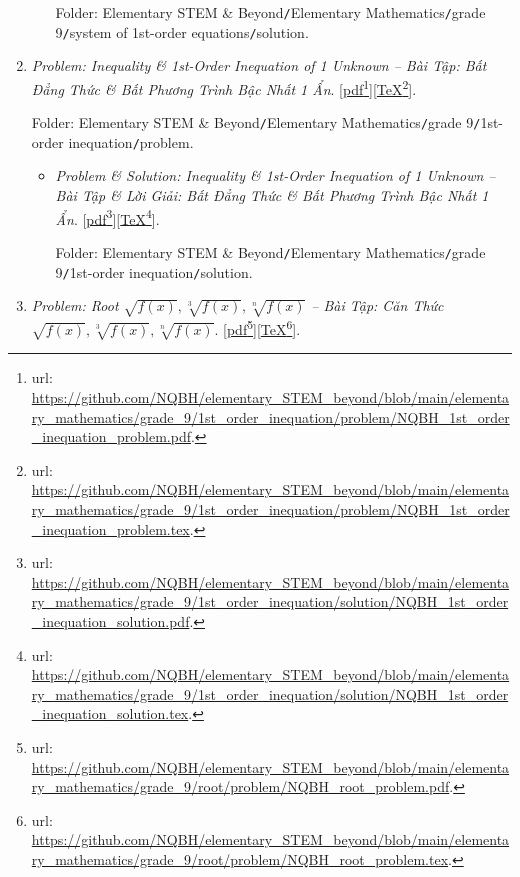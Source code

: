 \documentclass[12pt,oneside]{book}
\begin{document}
\begin{enumerate}
\begin{itemize}
		Folder: {\sf Elementary STEM \& Beyond{\tt/}Elementary Mathematics{\tt/}grade 9{\tt/}system of 1st-order equations{\tt/}solution}.
	\end{itemize}
	\item {\it Problem: Inequality \& 1st-Order Inequation of 1 Unknown -- Bài Tập: Bất Đẳng Thức \& Bất Phương Trình Bậc Nhất 1 Ẩn}. [\href{https://github.com/NQBH/elementary_STEM_beyond/blob/main/elementary_mathematics/grade_9/1st_order_inequation/problem/NQBH_1st_order_inequation_problem.pdf}{pdf}\footnote{{\sc url}: \url{https://github.com/NQBH/elementary_STEM_beyond/blob/main/elementary_mathematics/grade_9/1st_order_inequation/problem/NQBH_1st_order_inequation_problem.pdf}.}][\href{https://github.com/NQBH/elementary_STEM_beyond/blob/main/elementary_mathematics/grade_9/1st_order_inequation/problem/NQBH_1st_order_inequation_problem.tex}{\TeX}\footnote{{\sc url}: \url{https://github.com/NQBH/elementary_STEM_beyond/blob/main/elementary_mathematics/grade_9/1st_order_inequation/problem/NQBH_1st_order_inequation_problem.tex}.}].
	
	Folder: {\sf Elementary STEM \& Beyond{\tt/}Elementary Mathematics{\tt/}grade 9{\tt/}1st-order inequation{\tt/}problem}.
	\begin{itemize}
		\item {\it Problem \& Solution: Inequality \& 1st-Order Inequation of 1 Unknown -- Bài Tập \& Lời Giải: Bất Đẳng Thức \& Bất Phương Trình Bậc Nhất 1 Ẩn}. [\href{https://github.com/NQBH/elementary_STEM_beyond/blob/main/elementary_mathematics/grade_9/1st_order_inequation/solution/NQBH_1st_order_inequation_solution.pdf}{pdf}\footnote{{\sc url}: \url{https://github.com/NQBH/elementary_STEM_beyond/blob/main/elementary_mathematics/grade_9/1st_order_inequation/solution/NQBH_1st_order_inequation_solution.pdf}.}][\href{https://github.com/NQBH/elementary_STEM_beyond/blob/main/elementary_mathematics/grade_9/1st_order_inequation/solution/NQBH_1st_order_inequation_solution.tex}{\TeX}\footnote{{\sc url}: \url{https://github.com/NQBH/elementary_STEM_beyond/blob/main/elementary_mathematics/grade_9/1st_order_inequation/solution/NQBH_1st_order_inequation_solution.tex}.}].
		
		Folder: {\sf Elementary STEM \& Beyond{\tt/}Elementary Mathematics{\tt/}grade 9{\tt/}1st-order inequation{\tt/}solution}.
	\end{itemize}
	\item {\it Problem: Root $\sqrt{f(x)},\sqrt[3]{f(x)},\sqrt[n]{f(x)}$ -- Bài Tập: Căn Thức $\sqrt{f(x)},\sqrt[3]{f(x)},\sqrt[n]{f(x)}$}. [\href{https://github.com/NQBH/elementary_STEM_beyond/blob/main/elementary_mathematics/grade_9/root/problem/NQBH_root_problem.pdf}{pdf}\footnote{{\sc url}: \url{https://github.com/NQBH/elementary_STEM_beyond/blob/main/elementary_mathematics/grade_9/root/problem/NQBH_root_problem.pdf}.}][\href{https://github.com/NQBH/elementary_STEM_beyond/blob/main/elementary_mathematics/grade_9/root/problem/NQBH_root_problem.tex}{\TeX}\footnote{{\sc url}: \url{https://github.com/NQBH/elementary_STEM_beyond/blob/main/elementary_mathematics/grade_9/root/problem/NQBH_root_problem.tex}.}].
	

\end{enumerate}
\end{document}
